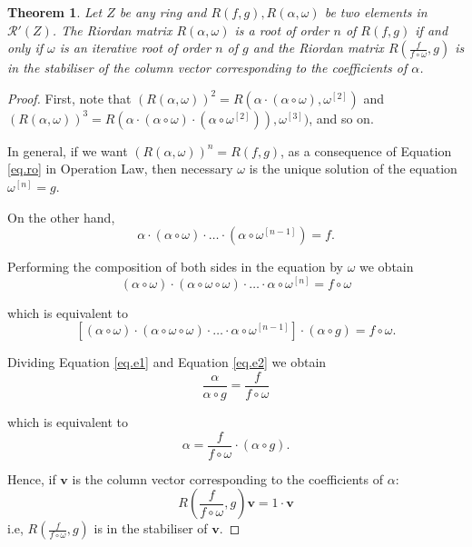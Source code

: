 \documentclass[preprint,12pt]{elsarticle}
\newtheorem{thm}{Theorem}
\begin{document}
\begin{thm}\label{theo.e} Let $Z$ be any ring and $R(f,g), R(\alpha,\omega)$ be two elements in $\mathcal R'(Z)$.  The Riordan matrix $R(\alpha,\omega)$ is a root of order $n$ of $R(f,g)$ if and only if $\omega$ is an iterative root of order $n$ of $g$ and the Riordan matrix $R\left(\frac{f}{f \circ \omega},g\right)$ is in the stabiliser of the column vector corresponding to the coefficients of $\alpha$.
\end{thm}

\begin{proof} First, note that $(R(\alpha,\omega))^2 = R(\alpha \cdot (\alpha \circ \omega),\omega^{[2]})$ and $(R(\alpha,\omega))^3 = R(\alpha \cdot (\alpha \circ \omega) \cdot (\alpha\circ \omega^{[2]})),\omega^{[3]})$, and so on. 

In general, if we want $(R(\alpha,\omega))^n=R(f,g)$, as a consequence of Equation \eqref{eq.ro} in Operation Law, then necessary $\omega$ is the unique solution of the equation $\omega^{[n]}=g$.


On the other hand, 
\begin{equation}\label{eq.e1}\alpha\cdot (\alpha\circ \omega)\cdot\ldots\cdot (\alpha \circ \omega^{[n-1]})=f. \end{equation}

\noindent Performing the composition of both sides in the equation by $\omega$ we obtain
$$(\alpha\circ\omega)\cdot (\alpha\circ \omega\circ\omega)\cdot\ldots\cdot \alpha \circ \omega^{[n]}=f\circ\omega$$

\noindent which is equivalent to
\begin{equation}\label{eq.e2}[(\alpha\circ\omega)\cdot (\alpha\circ \omega\circ\omega)\cdot\ldots\cdot \alpha \circ \omega^{[n-1]}]\cdot ( \alpha \circ g)=f\circ\omega. \end{equation}

\noindent Dividing Equation \eqref{eq.e1} and Equation \eqref{eq.e2} we obtain
$$\frac{\alpha}{\alpha\circ g}=\frac{f}{f\circ \omega} $$

\noindent which is equivalent to 
$$\alpha=\frac{f}{f\circ \omega}\cdot (\alpha\circ g).$$

Hence, if $\bm v$ is the column vector corresponding to the coefficients of $\alpha$:
$$
R\left(\frac{f}{f \circ \omega},g\right) \bm v = 1 \cdot \bm v
$$
i.e, $R\left(\frac{f}{f \circ \omega},g\right)$ is in the stabiliser of $\bm v$.
\end{proof}
\end{document}
